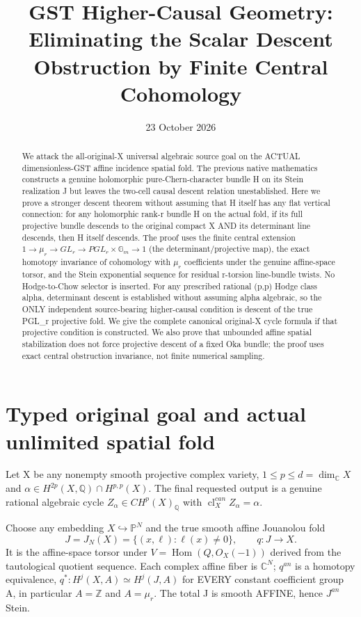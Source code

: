 \documentclass[11pt]{article}
\title{GST Higher-Causal Geometry: Eliminating the Scalar Descent Obstruction by Finite Central Cohomology}
\date{23 October 2026}
\begin{document}
\maketitle

\begin{abstract}
We attack the all-original-X universal algebraic source goal on the
ACTUAL dimensionless-GST affine incidence spatial fold. The previous
native mathematics constructs a genuine holomorphic pure-Chern-character
bundle H on its Stein realization J but leaves the two-cell
causal descent relation unestablished.
Here we prove a stronger descent theorem without assuming that H itself
has any flat vertical connection: for any holomorphic rank-r bundle H on
the actual fold, if its full projective bundle descends to the original
compact X AND its determinant line descends, then H itself descends.
The proof uses the finite central extension
$1\to\mu_r\to GL_r\to PGL_r\times\mathbb G_m\to1$
(the determinant/projective map), the exact homotopy
invariance of cohomology with $\mu_r$ coefficients
under the genuine affine-space torsor, and the
Stein exponential sequence for residual r-torsion
line-bundle twists. No Hodge-to-Chow selector is inserted.
For any prescribed rational (p,p) Hodge class alpha,
determinant descent is established without assuming
alpha algebraic, so the ONLY independent source-bearing
higher-causal condition is descent of the true PGL_r
projective fold. We give the complete canonical original-X
cycle formula if that projective condition is constructed.
We also prove that unbounded affine spatial stabilization
does not force projective descent of a fixed Oka bundle;
the proof uses exact central obstruction invariance,
not finite numerical sampling.
\end{abstract}

\section{Typed original goal and actual unlimited spatial fold}
Let X be any nonempty smooth projective complex variety,
$1\le p\le d=\dim_\mathbb CX$ and
$\alpha\in H^{2p}(X,\mathbb Q)\cap H^{p,p}(X)$.
The final requested output is a genuine rational algebraic
cycle $Z_\alpha\in CH^p(X)_\mathbb Q$ with
$\operatorname{cl}^{can}_X Z_\alpha=\alpha$.

Choose any embedding $X\hookrightarrow\mathbb P^N$
and the true smooth affine Jouanolou fold
\[
 J=J_N(X)=\{(x,\ell):\ell(x)\ne0\},
 \qquad q:J\longrightarrow X.                      \tag{1}
\]
It is the affine-space torsor under
$V=\operatorname{Hom}(Q,O_X(-1))$ derived
from the tautological quotient sequence.
Each complex affine fiber is $\mathbb C^N$;
$q^{an}$ is a homotopy equivalence,
$q^*:H^j(X,A)\simeq H^j(J,A)$ for EVERY
constant coefficient group A, in particular
$A=\mathbb Z$ and $A=\mu_r$.
The total J is smooth AFFINE,
hence $J^{an}$ Stein.
\end{document}
